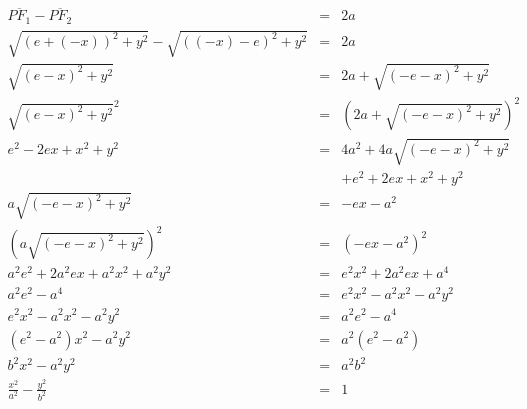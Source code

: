 \begin{displaymath}
	\begin{array}{rcl}
		\overline{{PF}_1} - \overline{{PF}_2} & = & 2a\\
		\sqrt{{(e+(-x))}^2 + y^2} - \sqrt{{((-x)-e)}^2 + y^2} & = & 2a\\
		\sqrt{{(e-x)}^2 + y^2} & = & 2a + \sqrt{{(-e-x)}^2 + y^2}\\
		\sqrt{{(e-x)}^2 + y^2}^2 & = & \left (2a + \sqrt{{(-e-x)}^2 + y^2}\right )^2\\
		e^2 - 2ex + x^2 + y^2 & = & 4a^2 + 4a \sqrt{(-e-x)^2+y^2}\\
		&& + e^2 + 2ex + x^2 + y^2\\
		a\sqrt{{(-e-x)}^2 + y^2} & = & -ex - a^2\\
		\left (a\sqrt{{(-e-x)}^2 + y^2}\right )^2 & = & \left(-ex - a^2\right)^2\\
		a^2e^2 + 2a^2ex + a^2x^2 + a^2y^2 &=& e^2x^2 + 2a^2ex + a^4\\
		a^2e^2 - a^4 &=& e^2x^2 - a^2x^2 - a^2y^2\\
		e^2x^2 - a^2x^2 - a^2y^2 &=& a^2e^2 - a^4\\
		\left(e^2 - a^2\right)x^2 - a^2y^2 &=& a^2\left(e^2 - a^2\right)\\
		b^2x^2 - a^2y^2 &=& a^2b^2\\
		\frac{x^2}{a^2} - \frac{y^2}{b^2} &=& 1
	\end{array}
\end{displaymath}	